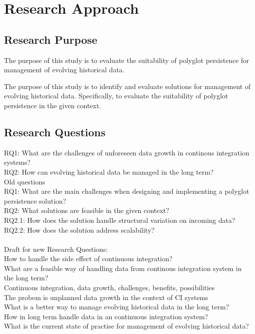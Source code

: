 \chapter{Research Approach}
\label{chap:research}

\section{Research Purpose}
The purpose of this study is to evaluate the suitability of polyglot persistence for management of evolving historical data.

The purpose of this study is to identify and evaluate solutions for management of evolving historical data. Specifically, to evaluate the suitability of polyglot persistence in the given context.

\section{Research Questions}
RQ1: What are the challenges of unforeseen data growth in continous integration systems? \\
RQ2: How can evolving historical data be managed in the long term? \\


Old questions\\
RQ1: What are the main challenges when designing and implementing a polyglot persistence solution?\\
RQ2: What solutions are feasible in the given context?\\
RQ2.1: How does the solution handle structural variation on incoming data?\\
RQ2.2: How does the solution address scalability?\\
\\
Draft for new Research Questions:\\
How to handle the side effect of continuous integration?\\
What are a feasible way of handling data from continous integration system in the long term?\\

Continuous integration, data growth, challenges, benefits, possibilities\\
The probem is unplanned data growth in the context of CI systems\\
What is a better way to manage evolving historical data in the long term?\\
How in long term handle data in an continuous integration system?\\
What is the current state of practise for management of evolving historical data?\\


